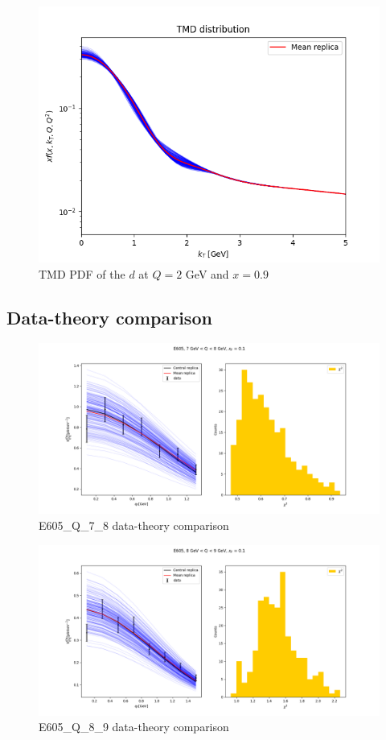 \documentclass[
]{article}
\begin{document}
\begin{figure}
\centering
\includegraphics{pngplots/tmd_1_2_0.9.png}
\caption{TMD PDF of the \(d\) at \(Q = 2\) GeV and \(x = 0.9\)}
\end{figure}

\hypertarget{data-theory-comparison}{%
\subsection{Data-theory comparison}\label{data-theory-comparison}}

\begin{figure}
\centering
\includegraphics{pngplots/E605_Q_7_8.png}
\caption{E605\_Q\_7\_8 data-theory comparison}
\end{figure}

\begin{figure}
\centering
\includegraphics{pngplots/E605_Q_8_9.png}
\caption{E605\_Q\_8\_9 data-theory comparison}
\end{figure}
\end{document}
